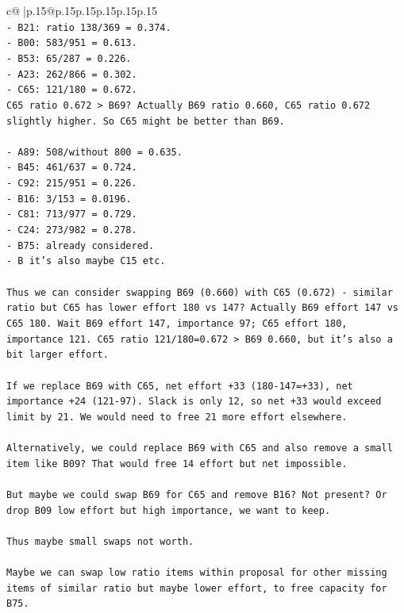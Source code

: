 \documentclass{article}
\begin{document}
{\begin{supertabular}{c@{$\;$}|p{.15\linewidth}@{}p{.15\linewidth}p{.15\linewidth}p{.15\linewidth}p{.15\linewidth}p{.15\linewidth}}
{{{\\ 
\texttt{{-} B21: ratio 138/369 = 0.374.} \\
\texttt{{-} B00: 583/951 = 0.613.} \\
\texttt{{-} B53: 65/287 = 0.226.} \\
\texttt{{-} A23: 262/866 = 0.302.} \\
\texttt{{-} C65: 121/180 = 0.672.} \\
\texttt{C65 ratio 0.672 > B69? Actually B69 ratio 0.660, C65 ratio 0.672 slightly higher. So C65 might be better than B69.} \\
\\ 
\texttt{{-} A89: 508/without 800 = 0.635.} \\
\texttt{{-} B45: 461/637 = 0.724.} \\
\texttt{{-} C92: 215/951 = 0.226.} \\
\texttt{{-} B16: 3/153 = 0.0196.} \\
\texttt{{-} C81: 713/977 = 0.729.} \\
\texttt{{-} C24: 273/982 = 0.278.} \\
\texttt{{-} B75: already considered.} \\
\texttt{{-} B it's also maybe C15 etc.} \\
\\ 
\texttt{Thus we can consider swapping B69 (0.660) with C65 (0.672) {-} similar ratio but C65 has lower effort 180 vs 147? Actually B69 effort 147 vs C65 180. Wait B69 effort 147, importance 97; C65 effort 180, importance 121. C65 ratio 121/180=0.672 > B69 0.660, but it's also a bit larger effort.} \\
\\ 
\texttt{If we replace B69 with C65, net effort +33 (180{-}147=+33), net importance +24 (121{-}97). Slack is only 12, so net +33 would exceed limit by 21. We would need to free 21 more effort elsewhere.} \\
\\ 
\texttt{Alternatively, we could replace B69 with C65 and also remove a small item like B09? That would free 14 effort but net impossible.} \\
\\ 
\texttt{But maybe we could swap B69 for C65 and remove B16? Not present? Or drop B09 low effort but high importance, we want to keep.} \\
\\ 
\texttt{Thus maybe small swaps not worth.} \\
\\ 
\texttt{Maybe we can swap low ratio items within proposal for other missing items of similar ratio but maybe lower effort, to free capacity for B75.} \\
}}}
\end{supertabular}}
\end{document}
